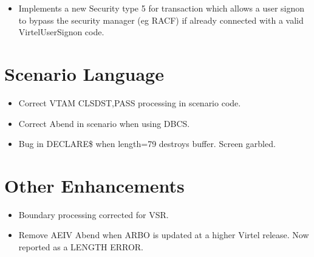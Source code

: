 \documentclass[letterpaper,10pt,english]{sphinxmanual}
\begin{document}
\begin{itemize}
\item {} 
Implements a new Security type 5 for transaction which allows a user signon to bypass the security manager (eg RACF) if already connected with a valid VirtelUserSignon code.

\end{itemize}

\newpage


\section{Scenario Language}
\label{\detokenize{TN202101:scenario-language}}
\begin{itemize}
\item {} 
Correct VTAM CLSDST,PASS processing in scenario code.

\end{itemize}

\begin{itemize}
\item {} 
Correct Abend in scenario when using DBCS.

\end{itemize}

\begin{itemize}
\item {} 
Bug in DECLARE\$ when length=79 destroys buffer. Screen garbled.

\end{itemize}

\newpage


\section{Other Enhancements}
\label{\detokenize{TN202101:other-enhancements}}
\begin{itemize}
\item {} 
Boundary processing corrected for VSR.

\end{itemize}

\begin{itemize}
\item {} 
Remove AEIV Abend when ARBO is updated at a higher Virtel release. Now reported as a LENGTH ERROR.

\end{itemize}
\end{document}
